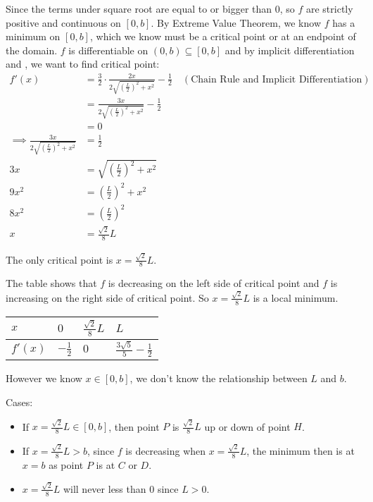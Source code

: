 \documentclass[12pt]{exam}
\newcommand*\circled[1]{\tikz[baseline=(char.base)]{
    \node[shape=circle, draw, inner sep=1pt, 
        minimum height=12pt] (char) {#1};}}
\begin{document}
\begin{enumerate}
Since the terms under square root are equal to or bigger than $0$, so $f$ are strictly positive and continuous on $[0,b]$. By Extreme Value Theorem, we know $f$ has a minimum on $[0,b]$, which we know must be a critical point or at an endpoint of the domain. $f$ is differentiable on $(0,b)\subseteq[0,b]$ and by implicit differentiation and \circled{3}, we want to find critical point:
\begin{align*}
    f'(x)
    &=\frac{3}{2}\cdot\frac{2x}{2\sqrt{(\frac{L}{2})^2+x^2}}-\frac{1}{2} \quad(\mbox{Chain Rule and Implicit Differentiation})\\
    &=\frac{3x}{2\sqrt{(\frac{L}{2})^2+x^2}}-\frac{1}{2}\\
    &=0\\
    \implies \frac{3x}{2\sqrt{(\frac{L}{2})^2+x^2}}&=\frac{1}{2}\\
    3x&=\sqrt{(\frac{L}{2})^2+x^2}\\
    9x^2&=(\frac{L}{2})^2+x^2\\
    8x^2&=(\frac{L}{2})^2\\
    x&=\frac{\sqrt{2}}{8}L
\end{align*}

The only critical point is $x=\frac{\sqrt{2}}{8}L$.

The table shows that $f$ is decreasing on the left side of critical point and $f$ is increasing on the right side of critical point. So $x=\frac{\sqrt{2}}{8}L$ is a local minimum.

\begin{tabular}{l|l|l|l}
\hline
$x$     & $0$            & $\frac{\sqrt{2}}{8}L$ & $L$                               \\
\hline
$f'(x)$ & $-\frac{1}{2}$ & $0$                   & $\frac{3\sqrt{5}}{5}-\frac{1}{2}$
\end{tabular}

However we know $x\in[0,b]$, we don't know the relationship between $L$ and $b$.

Cases:
\begin{itemize}
    \item If $x=\frac{\sqrt{2}}{8}L\in [0,b]$, then point $P$ is $\frac{\sqrt{2}}{8}L$ up or down of point $H$.
    \item If $x=\frac{\sqrt{2}}{8}L>b$, since $f$ is decreasing when $x=\frac{\sqrt{2}}{8}L$, the minimum then is at $x=b$ as point $P$ is at $C$ or $D$.
    \item $x=\frac{\sqrt{2}}{8}L$ will never less than $0$ since $L>0$.
\end{itemize}


\end{enumerate}
\end{document}
